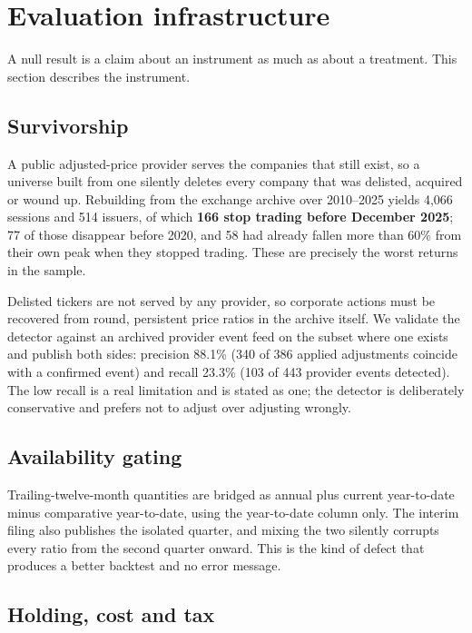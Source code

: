 \documentclass[10pt,conference]{IEEEtran}
\begin{document}
\section{Evaluation infrastructure}

A null result is a claim about an instrument as much as about a treatment. This section describes the instrument.

\subsection{Survivorship}

A public adjusted-price provider serves the companies that still exist, so a universe built from one silently deletes every company that was delisted, acquired or wound up. Rebuilding from the exchange archive over 2010--2025 yields 4{,}066 sessions and 514 issuers, of which \textbf{166 stop trading before December 2025}; 77 of those disappear before 2020, and 58 had already fallen more than 60\% from their own peak when they stopped trading. These are precisely the worst returns in the sample.

Delisted tickers are not served by any provider, so corporate actions must be recovered from round, persistent price ratios in the archive itself. We validate the detector against an archived provider event feed on the subset where one exists and publish both sides: precision 88.1\% (340 of 386 applied adjustments coincide with a confirmed event) and recall 23.3\% (103 of 443 provider events detected). The low recall is a real limitation and is stated as one; the detector is deliberately conservative and prefers not to adjust over adjusting wrongly.

\subsection{Availability gating}

Trailing-twelve-month quantities are bridged as annual plus current year-to-date minus comparative year-to-date, using the year-to-date column only. The interim filing also publishes the isolated quarter, and mixing the two silently corrupts every ratio from the second quarter onward. This is the kind of defect that produces a better backtest and no error message.

\subsection{Holding, cost and tax}
\end{document}
